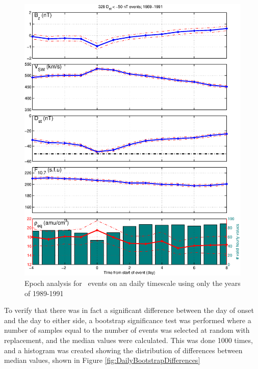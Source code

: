 \begin{figure}[htp!]
	\centering
	\includegraphics[width=1\linewidth]{Figures/StormAvs/stormavs-dst-50-tak-GOES6}
	\caption{Epoch analysis for \dst\ events on an daily timescale using only the years of 1989-1991}
	\label{fig:EpochDstDayTakahashi}
\end{figure}



To verify that there was in fact a significant difference between the day of onset and the day to either side, a bootstrap significance test was performed where a number of samples equal to the number of events was selected at random with replacement, and the median values were calculated. This was done 1000 times, and a histogram was created showing the distribution of differences between median values, shown in Figure \ref{fig:DailyBootstrapDifferences}

